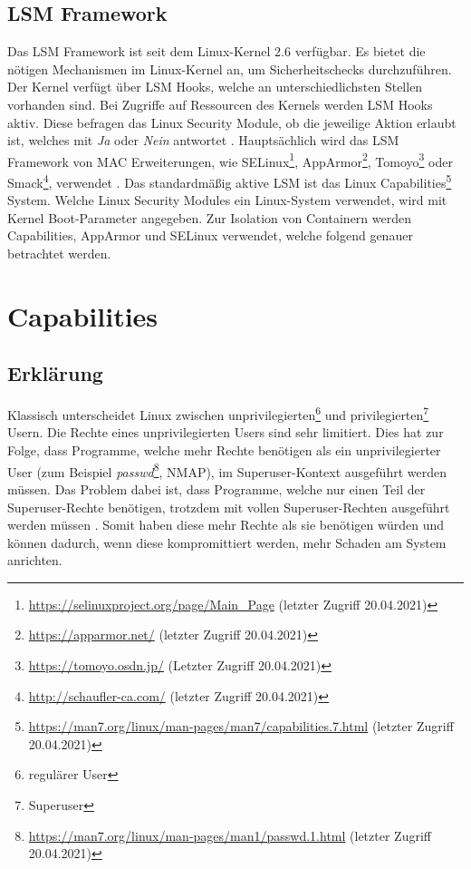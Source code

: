 \subsection{LSM Framework}
\label{lab:lsm_framework}
Das LSM Framework ist seit dem Linux-Kernel 2.6 verfügbar. Es bietet die
nötigen Mechanismen im Linux-Kernel an, um Sicherheitschecks
durchzuführen. Der Kernel verfügt über LSM Hooks, welche an unterschiedlichsten
Stellen vorhanden sind. Bei Zugriffe auf Ressourcen des Kernels werden LSM
Hooks aktiv. Diese befragen das Linux Security Module, ob die jeweilige Aktion
erlaubt ist, welches mit \emph{Ja} oder \emph{Nein} antwortet
\cite{LinuxSecurityModuleFramework}.  Hauptsächlich wird das LSM Framework von
MAC Erweiterungen, wie
SELinux\footnote{\url{https://selinuxproject.org/page/Main_Page} (letzter
Zugriff 20.04.2021)}, AppArmor\footnote{\url{https://apparmor.net/} (letzter
Zugriff 20.04.2021)}, Tomoyo\footnote{\url{https://tomoyo.osdn.jp/} (Letzter
Zugriff 20.04.2021)} oder Smack\footnote{\url{http://schaufler-ca.com/}
(letzter Zugriff 20.04.2021)}, verwendet \cite{kernel_lsm2}. Das standardmäßig
aktive LSM ist das Linux
Capabilities\footnote{\url{https://man7.org/linux/man-pages/man7/capabilities.7.html}
(letzter Zugriff 20.04.2021)} System. Welche Linux Security Modules ein Linux-System
verwendet, wird mit Kernel Boot-Parameter angegeben. Zur Isolation von
Containern werden Capabilities, AppArmor und SELinux verwendet, welche folgend
genauer betrachtet werden.

\section{Capabilities}
\label{lab:capabilities}

\subsection{Erklärung}
Klassisch unterscheidet Linux zwischen unprivilegierten\footnote{regulärer
User} und privilegierten\footnote{Superuser} Usern. Die Rechte eines
unprivilegierten Users sind sehr limitiert. Dies hat zur Folge, dass Programme,
welche mehr Rechte benötigen als ein unprivilegierter User (zum Beispiel
\emph{passwd}\footnote{\url{https://man7.org/linux/man-pages/man1/passwd.1.html}
(letzter Zugriff 20.04.2021)}, NMAP), im Superuser-Kontext ausgeführt werden
müssen. Das Problem dabei ist, dass Programme, welche nur einen Teil der
Superuser-Rechte benötigen, trotzdem mit vollen Superuser-Rechten ausgeführt
werden müssen \cite{LinuxCapabilitesmakingthemwork}. Somit haben diese mehr
Rechte als sie benötigen würden und können dadurch, wenn diese kompromittiert
werden, mehr Schaden am System anrichten.

